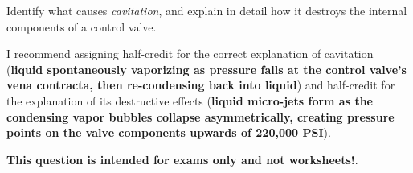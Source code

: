 

Identify what causes {\it cavitation}, and explain in detail how it destroys the internal components of a control valve.

\vskip 100pt







I recommend assigning half-credit for the correct explanation of cavitation ({\bf liquid spontaneously vaporizing as pressure falls at the control valve's vena contracta, then re-condensing back into liquid}) and half-credit for the explanation of its destructive effects ({\bf liquid micro-jets form as the condensing vapor bubbles collapse asymmetrically, creating pressure points on the valve components upwards of 220,000 PSI}).







{\bf This question is intended for exams only and not worksheets!}.



